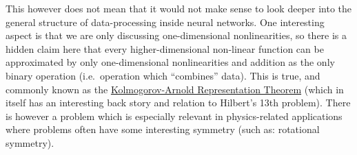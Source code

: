 \documentclass[11pt]{article}
\begin{document}
This however does not mean that it would not make sense to look deeper
into the general structure of data-processing inside neural networks.
One interesting aspect is that we are only discussing one-dimensional
nonlinearities, so there is a hidden claim here that every
higher-dimensional non-linear function can be approximated by only
one-dimensional nonlinearities and addition as the only binary operation
(i.e.~operation which ``combines'' data). This is true, and commonly
known as the
\href{https://en.wikipedia.org/wiki/Kolmogorov\%E2\%80\%93Arnold_representation_theorem}{Kolmogorov-Arnold
Representation Theorem} (which in itself has an interesting back story
and relation to Hilbert's 13th problem). There is however a problem
which is especially relevant in physics-related applications where
problems often have some interesting symmetry (such as: rotational
symmetry).
\end{document}
